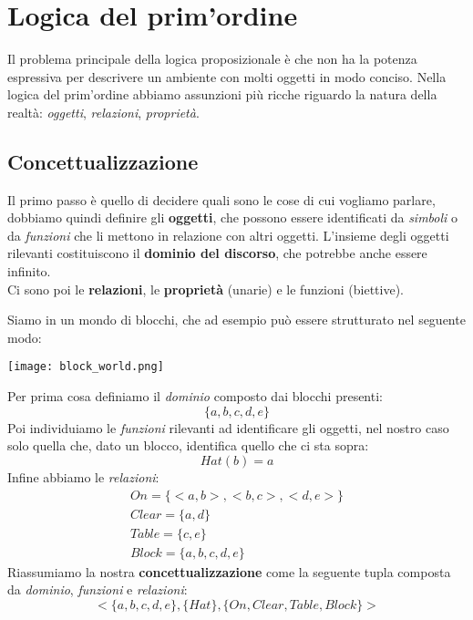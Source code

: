 \newpage
\section{Logica del prim'ordine}
Il problema principale della logica proposizionale è che non ha la potenza espressiva per descrivere un ambiente con molti oggetti in modo conciso. Nella logica del prim'ordine abbiamo assunzioni più ricche riguardo la natura della realtà: \textit{oggetti}, \textit{relazioni}, \textit{proprietà}.\\

\subsection{Concettualizzazione}
Il primo passo è quello di decidere quali sono le cose di cui vogliamo parlare, dobbiamo quindi definire gli \textbf{oggetti}, che possono essere identificati da \textit{simboli} o da \textit{funzioni} che li mettono in relazione con altri oggetti. L'insieme degli oggetti rilevanti costituiscono il \textbf{dominio del discorso}, che potrebbe anche essere infinito.\\
Ci sono poi le \textbf{relazioni}, le \textbf{proprietà} (unarie) e le funzioni (biettive).

\begin{example}
	Siamo in un mondo di blocchi, che ad esempio può essere strutturato nel seguente modo:
	\begin{center}
		\texttt{[image: block\_world.png]}
	\end{center}
	Per prima cosa definiamo il \textit{dominio} composto dai blocchi presenti:
	\begin{equation*}
		\{a,b,c,d,e\}
	\end{equation*}
	Poi individuiamo le \textit{funzioni} rilevanti ad identificare gli oggetti, nel nostro caso solo quella che, dato un blocco, identifica quello che ci sta sopra:
	\begin{equation*}
		Hat(b)=a
	\end{equation*}
	Infine abbiamo le \textit{relazioni}:
	\begin{gather*}
		On=\{<a,b>,<b,c>,<d,e>\} \\
		Clear=\{a,d\}\\
		Table=\{c,e\}\\
		Block=\{a,b,c,d,e\}
	\end{gather*}
	Riassumiamo la nostra \textbf{concettualizzazione} come la seguente tupla composta da \textit{dominio}, \textit{funzioni} e \textit{relazioni}:
	\begin{equation*}
		<\{a,b,c,d,e\}, \{Hat\}, \{On, Clear, Table, Block\}>
	\end{equation*}
\end{example}

